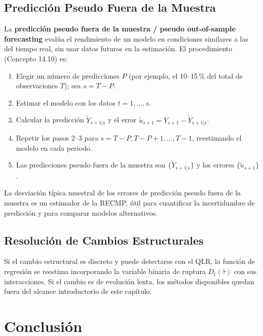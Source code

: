 \documentclass[12pt]{article}
\begin{document}
\subsection{Predicci\'on Pseudo Fuera de la Muestra}

La \textbf{predicci\'on pseudo fuera de la muestra / pseudo out-of-sample forecasting} eval\'ua el rendimiento de un modelo en condiciones similares a las del tiempo real, sin usar datos futuros en la estimaci\'on. El procedimiento (Concepto 14.10) es:

\begin{enumerate}
  \item Elegir un n\'umero de predicciones $P$ (por ejemplo, el 10--15\,\% del total de observaciones $T$); sea $s = T - P$.
  \item Estimar el modelo con los datos $t = 1, \ldots, s$.
  \item Calcular la predicci\'on $\widetilde{Y}_{s+1|s}$ y el error $\tilde{u}_{s+1} = Y_{s+1} - \widetilde{Y}_{s+1|s}$.
  \item Repetir los pasos 2--3 para $s = T-P, T-P+1, \ldots, T-1$, reestimando el modelo en cada periodo.
  \item Las predicciones pseudo fuera de la muestra son $\{\widetilde{Y}_{s+1|s}\}$ y los errores $\{\tilde{u}_{s+1}\}$.
\end{enumerate}

La desviaci\'on t\'ipica muestral de los errores de predicci\'on pseudo fuera de la muestra es un estimador de la RECMP, \'util para cuantificar la incertidumbre de predicci\'on y para comparar modelos alternativos.

\subsection{Resoluci\'on de Cambios Estructurales}

Si el cambio estructural es discreto y puede detectarse con el QLR, la funci\'on de regresi\'on se reestima incorporando la variable binaria de ruptura $D_t(\hat{\tau})$ con sus interacciones. Si el cambio es de evoluci\'on lenta, los m\'etodos disponibles quedan fuera del alcance introductorio de este cap\'itulo.

\section{Conclusi\'on}
\end{document}

